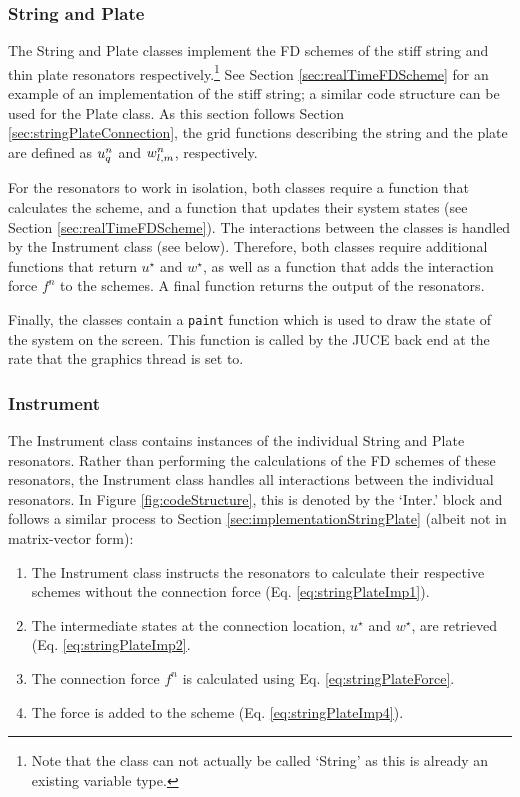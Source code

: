 \subsubsection{String and Plate}
The String and Plate classes implement the FD schemes of the stiff string and thin plate resonators respectively.\footnote{Note that the class can not actually be called `String' as this is already an existing variable type.} See Section \ref{sec:realTimeFDScheme} for an example of an implementation of the stiff string; a similar code structure can be used for the Plate class. As this section follows Section \ref{sec:stringPlateConnection}, the grid functions describing the string and the plate are defined as $u_q^n$ and $w_{l,m}^n$, respectively. 

For the resonators to work in isolation, both classes require a function that calculates the scheme, and a function that updates their system states (see Section \ref{sec:realTimeFDScheme}). The interactions between the classes is handled by the Instrument class (see below). Therefore, both classes require additional functions that return $u^\star$ and $w^\star$, as well as a function that adds the interaction force $f^n$ to the schemes. A final function returns the output of the resonators.

Finally, the classes contain a \texttt{paint} function which is used to draw the state of the system on the screen. This function is called by the JUCE back end at the rate that the graphics thread is set to.

\subsubsection{Instrument}
The Instrument class contains instances of the individual String and Plate resonators. Rather than performing the calculations of the FD schemes of these resonators, the Instrument class handles all interactions between the individual resonators. In Figure \ref{fig:codeStructure}, this is denoted by the `Inter.' block and follows a similar process to Section \ref{sec:implementationStringPlate} (albeit not in matrix-vector form):
\begin{enumerate}
    \item The Instrument class instructs the resonators to calculate their respective schemes without the connection force (Eq. \eqref{eq:stringPlateImp1}).
    \item The intermediate states at the connection location, $u^\star$ and $w^\star$, are retrieved (Eq. \eqref{eq:stringPlateImp2}.
    \item The connection force $f^n$ is calculated using Eq. \eqref{eq:stringPlateForce}.
    \item The force is added to the scheme (Eq. \eqref{eq:stringPlateImp4}).
\end{enumerate}

